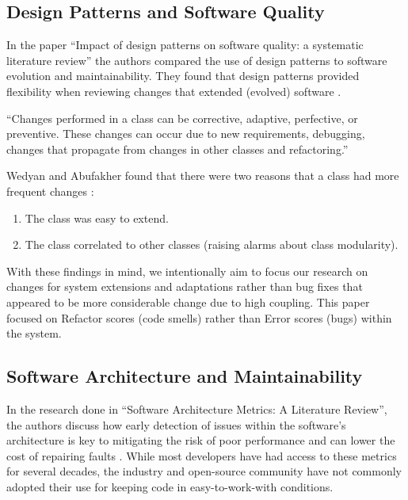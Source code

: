 \subsection{Design Patterns and Software Quality}

In the paper ``Impact of design patterns on software quality: a systematic literature review'' the authors compared the use of design patterns to software evolution and maintainability. They found that design patterns provided flexibility when reviewing changes that extended (evolved) software \cite{wedyan:2020}.

\vspace{0.25cm}
\begin{displayquote}
  ``Changes performed in a class can be corrective, adaptive, perfective, or preventive. These changes can occur due to new requirements, debugging, changes that propagate from changes in other classes and refactoring.''
\end{displayquote}
\vspace{0.25cm}

Wedyan and Abufakher found that there were two reasons that a class had more frequent changes \cite{wedyan:2020}:

\vspace{0.25cm}
\begin{enumerate}
    \item The class was easy to extend.
    \item The class correlated to other classes (raising alarms about class modularity).
\end{enumerate}
\vspace{0.25cm}

With these findings in mind, we intentionally aim to focus our research on changes for system extensions and adaptations rather than bug fixes that appeared to be more considerable change due to high coupling. This paper focused on Refactor scores (code smells) rather than Error scores (bugs) within the system.

\subsection{Software Architecture and Maintainability}

In the research done in ``Software Architecture Metrics: A Literature Review'', the authors discuss how early detection of issues within the software's architecture is key to mitigating the risk of poor performance and can lower the cost of repairing faults \cite{coulin:2019}. While most developers have had access to these metrics for several decades, the industry and open-source community have not commonly adopted their use for keeping code in easy-to-work-with conditions.

